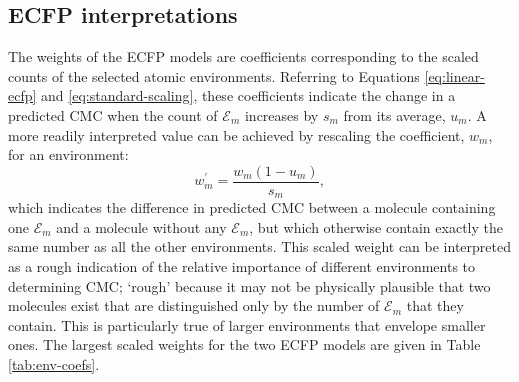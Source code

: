 \subsection{ECFP interpretations}

The weights of the ECFP models are coefficients corresponding to the scaled counts of the selected atomic environments. Referring to Equations \ref{eq:linear-ecfp} and \ref{eq:standard-scaling}, these coefficients indicate
the change in a predicted CMC when the count of $\mathcal{E}_m$ increases by $s_m$ from its average, $u_m$. A more readily interpreted value can be achieved by rescaling the coefficient, $w_m$, for an environment:
\begin{equation}
    w_m^\prime = \frac{w_m(1 - u_m)}{s_m},
\end{equation}
which indicates the difference in predicted CMC between a molecule containing one $\mathcal{E}_m$ and a molecule without any $\mathcal{E}_m$, but which otherwise contain exactly the same number as all the other environments. This
scaled weight can be interpreted as a rough indication of the relative importance of different environments to determining CMC; `rough' because it may not be physically plausible that two molecules exist that are distinguished only
by the number of $\mathcal{E}_m$ that they contain. This is particularly true of larger environments that envelope smaller ones. The largest scaled weights for the two ECFP models are given in Table \ref{tab:env-coefs}.

